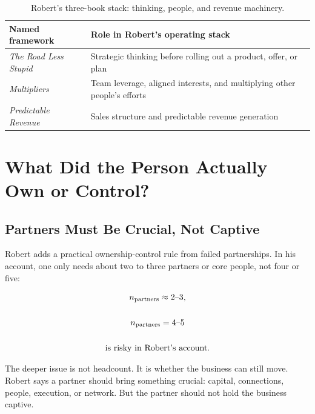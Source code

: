 \documentclass[11pt,oneside]{book}
\begin{document}
\begin{table}
\centering
\small
\begin{tabular}{|p{.30\linewidth}|p{.58\linewidth}|}
\hline
\textbf{Named framework} & \textbf{Role in Robert's operating stack}\\
\hline
\emph{The Road Less Stupid} & Strategic thinking before rolling out a product, offer, or plan\\
\hline
\emph{Multipliers} & Team leverage, aligned interests, and multiplying other people's efforts\\
\hline
\emph{Predictable Revenue} & Sales structure and predictable revenue generation\\
\hline
\end{tabular}
\caption{Robert's three-book stack: thinking, people, and revenue machinery.}
\end{table}

\chapter{What Did the Person Actually Own or Control?}

\section{Partners Must Be Crucial, Not Captive}

Robert adds a practical ownership-control rule from failed partnerships. In his account, one only needs about two to three partners or core people, not four or five:

\begin{equation}
\begin{gathered}
n_{\mathrm{partners}}\approx 2\hbox{--}3,\\
\qquad\\
n_{\mathrm{partners}}=4\hbox{--}5\\
\quad\\
\hbox{is risky in Robert's account.}
\end{gathered}
\end{equation}

The deeper issue is not headcount. It is whether the business can still move. Robert says a partner should bring something crucial: capital, connections, people, execution, or network. But the partner should not hold the business captive.
\end{document}
